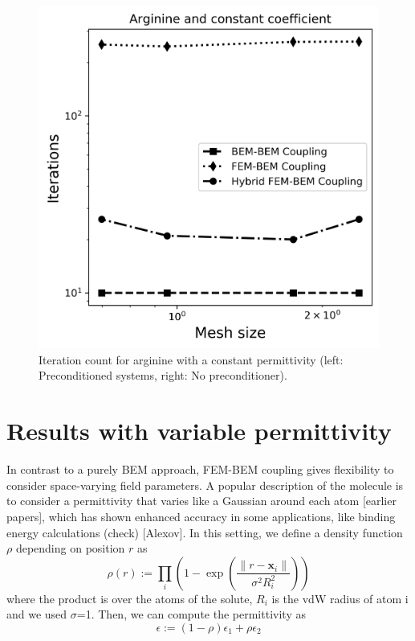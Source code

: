 \begin{figure}
\centering
  \includegraphics[width=0.45\linewidth]{Arginine_const_coeff_iter.png}
\caption{Iteration count for arginine with a constant permittivity (left: Preconditioned systems, right: No preconditioner). %
}
\label{fig:arg_contant_iter}
\end{figure}



\section*{\sffamily \Large Results with variable permittivity}

In contrast to a purely BEM approach, FEM-BEM coupling gives flexibility to consider space-varying field parameters. 
A popular description of the molecule is to consider a permittivity that varies like a Gaussian around each atom [earlier papers], which has shown enhanced accuracy in some applications, like binding energy calculations (check) [Alexov].
In this setting, we define a density function $\rho$ depending on position $r$ as
%
\begin{equation}
\rho(r) := \prod_i \left(1 - \exp{\left(\frac{\|r-\mathbf{x}_i\|}{\sigma^2 R_i^2}\right)}\right)
\end{equation}
%
where the product is over the atoms of the solute, $R_i$ is the vdW
radius of atom i and we used $\sigma$=1. Then, we can compute the permittivity as
%
\begin{equation}
\epsilon := \left(1-\rho \right) \epsilon_1 + \rho\epsilon_2
\end{equation}
%

